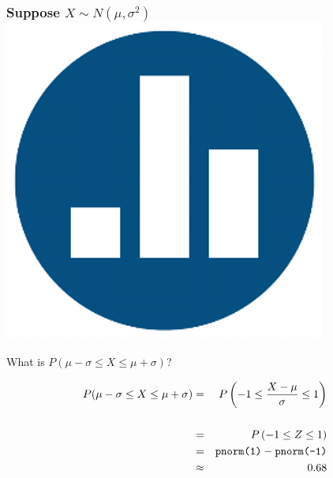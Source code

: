 \documentclass[handout]{beamer}
\begin{document}
\begin{frame}
\frametitle{Suppose $X \sim N(\mu, \sigma^2)$\hfill \includegraphics[scale = 0.05]{./images/clicker}}
What is $P(\mu - \sigma \leq X \leq \mu + \sigma)$?

\pause
\begin{eqnarray*}
P(\mu - \sigma \leq X \leq \mu + \sigma) &=& P\left( -1 \leq \frac{X-\mu}{\sigma} \leq 1\right)\\ \\
	&=& P\left( -1 \leq Z \leq 1\right)\\
	&=& \mbox{\texttt{pnorm(1)}} -  \mbox{\texttt{pnorm(-1)}}\\
	&\approx& 0.68
\end{eqnarray*}
\end{frame}

\end{document}
